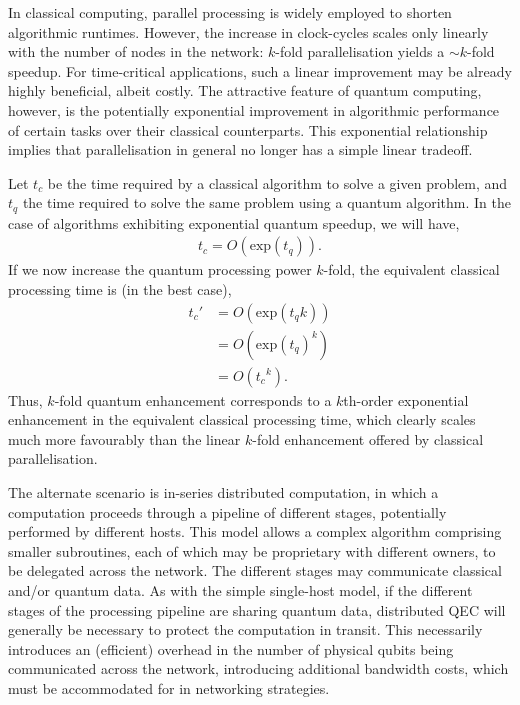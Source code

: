 \documentclass[aps,rmp,twocolumn,amsmath,amssymb,nofootinbib,superscriptaddress,longbibliography,floatfix,table-of-contents,eqsecnum]{revtex4-1}
\begin{document}
In classical computing, parallel processing is widely employed to shorten algorithmic runtimes. However, the increase in clock-cycles scales only linearly with the number of nodes in the network: $k$-fold parallelisation yields a \mbox{$\sim k$}-fold speedup. For time-critical applications, such a linear improvement may be already highly beneficial, albeit costly. The attractive feature of quantum computing, however, is the potentially exponential improvement in algorithmic performance of certain tasks over their classical counterparts. This exponential relationship implies that parallelisation in general no longer has a simple linear tradeoff.

Let $t_c$ be the time required by a classical algorithm to solve a given problem, and $t_q$ the time required to solve the same problem using a quantum algorithm. In the case of algorithms exhibiting exponential quantum speedup, we will have,
\begin{align}
t_c = O(\text{exp}(t_q)).
\end{align}
If we now increase the quantum processing power $k$-fold, the equivalent classical processing time is (in the best case),
\begin{align}
t_c' &= O(\text{exp}(t_q k)) \nonumber \\
&= O(\text{exp}(t_q)^{k}) \nonumber \\
&= O({t_c}^{k}).
\end{align}
Thus, $k$-fold quantum enhancement corresponds to a $k$th-order exponential enhancement in the equivalent classical processing time, which clearly scales much more favourably than the linear $k$-fold enhancement offered by classical parallelisation.

The alternate scenario is in-series distributed computation, in which a computation proceeds through a pipeline of different stages, potentially performed by different hosts. This model allows a complex algorithm comprising smaller subroutines, each of which may be proprietary with different owners, to be delegated across the network. The different stages may communicate classical and/or quantum data. As with the simple single-host model, if the different stages of the processing pipeline are sharing quantum data, distributed QEC will generally be necessary to protect the computation in transit. This necessarily introduces an (efficient) overhead in the number of physical qubits being communicated across the network, introducing additional bandwidth costs, which must be accommodated for in networking strategies.
\end{document}
